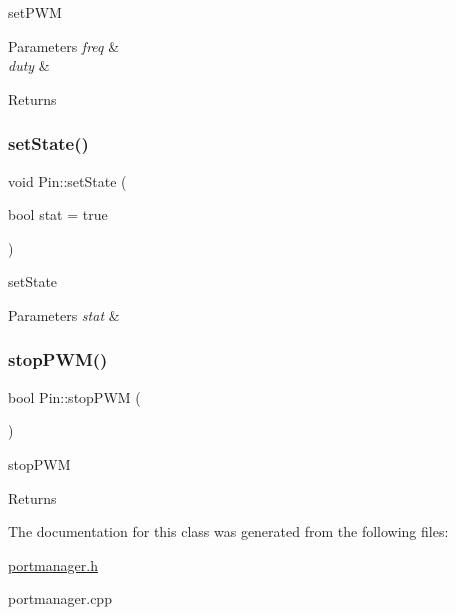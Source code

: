 set\+P\+WM 


\begin{DoxyParams}{Parameters}
{\em freq} & \\
\hline
{\em duty} & \\
\hline
\end{DoxyParams}
\begin{DoxyReturn}{Returns}

\end{DoxyReturn}
\mbox{\label{classPin_a2488d5db01d0bae6d5fe8932b39d3bbe}} 
\subsubsection{\texorpdfstring{set\+State()}{setState()}}
{\footnotesize\ttfamily void Pin\+::set\+State (\begin{DoxyParamCaption}\item[{bool}]{stat = {\ttfamily true} }\end{DoxyParamCaption})}



set\+State 


\begin{DoxyParams}{Parameters}
{\em stat} & \\
\hline
\end{DoxyParams}
\mbox{\label{classPin_a4ea18c4f3780b3af59406be5d0b5a176}} 
\subsubsection{\texorpdfstring{stop\+P\+W\+M()}{stopPWM()}}
{\footnotesize\ttfamily bool Pin\+::stop\+P\+WM (\begin{DoxyParamCaption}{ }\end{DoxyParamCaption})}



stop\+P\+WM 

\begin{DoxyReturn}{Returns}

\end{DoxyReturn}


The documentation for this class was generated from the following files\+:\begin{DoxyCompactItemize}
\item 
\hyperlink{portmanager_8h}{portmanager.\+h}\item 
portmanager.\+cpp\end{DoxyCompactItemize}
